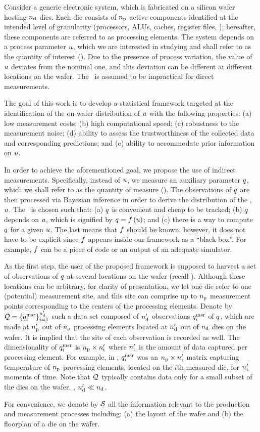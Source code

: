 Consider a generic electronic system, which is fabricated on a silicon wafer hosting ${n_\text{d}}$ dies.
Each die consists of ${n_\text{p}}$ active components identified at the intended level of granularity (processors, ALUs, caches, register files, \etc); hereafter, these components are referred to as processing elements.
The system depends on a process parameter $u$, which we are interested in studying and shall refer to as the quantity of interest (\qoi).
Due to the presence of process variation, the value of $u$ deviates from the nominal one, and this deviation can be different at different locations on the wafer.
The \qoi\ is assumed to be impractical for direct measurements.

The goal of this work is to develop a statistical framework targeted at the identification of the on-wafer distribution of $u$ with the following properties: (a) low measurement costs; (b) high computational speed; (c) robustness to the measurement noise; (d) ability to assess the trustworthiness of the collected data and corresponding predictions; and (e) ability to accommodate prior information on $u$.

In order to achieve the aforementioned goal, we propose the use of indirect measurements.
Specifically, instead of $u$, we measure an auxiliary parameter $q$, which we shall refer to as the quantity of measure (\qom).
The observations of $q$ are then processed via Bayesian inference in order to derive the distribution of the \qoi, $u$.
The \qom\ is chosen such that: (a) $q$ is convenient and cheap to be tracked; (b) $q$ depends on $u$, which is signified by $\q = \oBB{\u}$; and (c) there is a way to compute $q$ for a given $u$.
The last means that $\oBB$ should be known; however, it does not have to be explicit since $\oBB$ appears inside our framework as a ``black box''.
For example, $\oBB$ can be a piece of code or an output of an adequate simulator.

As the first step, the user of the proposed framework is supposed to harvest a set of observations of $q$ at several locations on the wafer (recall ).
Although these locations can be arbitrary, for clarity of presentation, we let one die refer to one (potential) measurement site, and this site can comprise up to ${n_\text{p}}$ measurement points corresponding to the centers of the processing elements.
Denote by $\mathcal{Q} = \{ q_i^{\text{msr}} \}_{i = 1}^{n_\text{d}'}$ such a data set composed of ${n_\text{d}'}$ observations $q_i^{\text{msr}}$ of $q$, which are made at ${n_\text{p}'}$ out of ${n_\text{p}}$ processing elements located at ${n_\text{d}'}$ out of ${n_\text{d}}$ dies on the wafer.
It is implied that the site of each observation is recorded as well.
The dimensionality of $q_i^{\text{msr}}$ is ${n_\text{p}} \times {n_\text{t}'}$ where ${n_\text{t}'}$ is the amount of data captured per processing element.
For example, in , $q_i^{\text{msr}}$ was an ${n_\text{p}} \times {n_\text{t}'}$ matrix capturing temperature of ${n_\text{p}}$ processing elements, located on the $i$th measured die, for ${n_\text{t}'}$ moments of time.
Note that $\mathcal{Q}$ typically contains data only for a small subset of the dies on the wafer, \ie, ${n_\text{d}'} \ll {n_\text{d}}$.

For convenience, we denote by $\mathcal{S}$ all the information relevant to the production and measurement processes including: (a) the layout of the wafer and (b) the floorplan of a die on the wafer.
